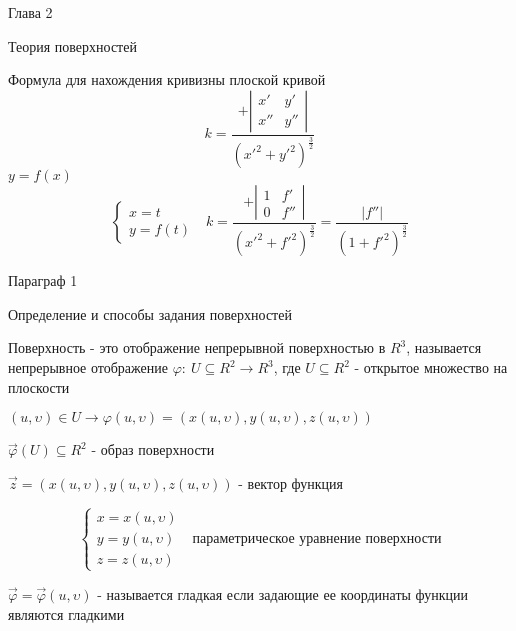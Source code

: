 \begin{title}
  Глава 2
\end{title}

\begin{title}
  Теория поверхностей
\end{title}

Формула для нахождения кривизны плоской кривой
$$
k = \frac{
  + \left|
  \begin{array}{cc}
    x' & y' \\
    x'' & y''
  \end{array}
  \right|
}{(x'^2 + y'^2)^{\frac{3}{2}}}
$$
$y = f(x)$
$$
  \left\{
  \begin{array}{c}
    x = t \\
    y = f(t)
  \end{array}
  \right. ~~~
k = \frac{
  + \left|
  \begin{array}{cc}
    1 & f' \\
    0 & f''
  \end{array}
  \right|
}{(x'^2 + f'^2)^{\frac{3}{2}}}
=
\frac{|f''|}{(1 + f'^2)^{\frac{3}{2}}}
$$

\begin{title}
  Параграф 1
\end{title}

\begin{title}[\Large]
  Определение и способы задания поверхностей
\end{title}

\begin{define}
  Поверхность - это отображение непрерывной поверхностью в $R^3$, называется
  непрерывное отображение $\varphi: ~ U \subseteq R^2 \to R^3$, где
  $U \subseteq R^2$ - открытое множество на плоскости

  $(u, \upsilon) \in U \to \varphi(u, \upsilon) = (x(u, \upsilon),
  y(u, \upsilon), z(u, \upsilon))$

  $\vec \varphi (U) \subseteq R^2$ - образ поверхности

  $\vec z = (x(u, \upsilon), y(u, \upsilon), z(u, \upsilon))$ - вектор функция

  $$
  \left\{
  \begin{array}{c}
    x = x(u, \upsilon) \\
    y = y(u, \upsilon) \\
    z = z(u, \upsilon)
  \end{array}
  \right. ~~~ \text{параметрическое уравнение поверхности}
  $$

  $\vec \varphi = \vec \varphi(u, \upsilon)$ - называется гладкая если
  задающие ее координаты функции являются гладкими
\end{define}

